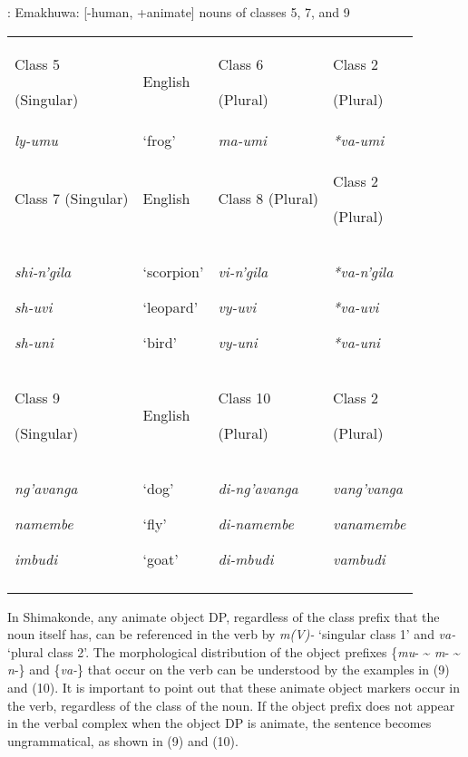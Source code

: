 \documentclass[output=paper]{langsci/langscibook}
\begin{document}
\begin{table}

{\textmd{: }}Emakhuwa: [-human, +animate] nouns of classes 5, 7, and 9


\begin{tabularx}{\textwidth}{XXXX}
\lsptoprule

 Class 5

 (Singular)& English& Class 6

 (Plural)& Class 2

 (Plural)\\
 \textit{ly-umu}& ‘frog’& \textit{ma-umi}& \textit{*va-umi}\\
 Class 7 (Singular)& English& Class 8 (Plural)& Class 2

 (Plural)\\
 \textit{shi-n’gila}

 \textit{sh-uvi}

 \textit{sh-uni}& ‘scorpion’

 ‘leopard’

 ‘bird’& \textit{vi-n’gila}

 \textit{vy-uvi}

 \textit{vy-uni}& \textit{*va-n’gila}

 \textit{*va-uvi}

 \textit{*va-uni}\\
{\mdseries Class 9}

{\mdseries (Singular)} & {\mdseries English} & {\mdseries Class 10}

{\mdseries (Plural)} & {\mdseries Class 2}

{\mdseries (Plural)}\\
 \textit{ng’avanga}

 \textit{namembe}

 \textit{imbudi}& ‘dog’

 ‘fly’

 ‘goat’& \textit{di-ng’avanga}

 \textit{di-namembe}

 \textit{di-mbudi}& \textit{vang’vanga}

 \textit{vanamembe}

 \textit{vambudi}\\
\lspbottomrule
\end{tabularx}

\end{table}

{In Shimakonde, any animate object DP, regardless of the class prefix that the noun itself has, can be referenced in the verb by }{\textit{m(V)- }}{‘singular class 1’ and }{\textit{va-}} {‘plural class 2’. }{The morphological distribution of the object prefixes }{\{}{\textit{mu}}{{}- {\textasciitilde} }{\textit{m}}{{}- {\textasciitilde} }{\textit{n}}{{}-\} and \{}{\textit{va-}}{\} that occur on the verb }{can be understood by the examples in }(9) {and }(10){. It is important to point out that t}hese animate object markers occur in the verb, regardless of the class of the noun. {If the object prefix does not appear in the verbal complex when the object DP is animate, the sentence becomes ungrammatical, as shown in }(9) {and }(10){.}
\end{document}
